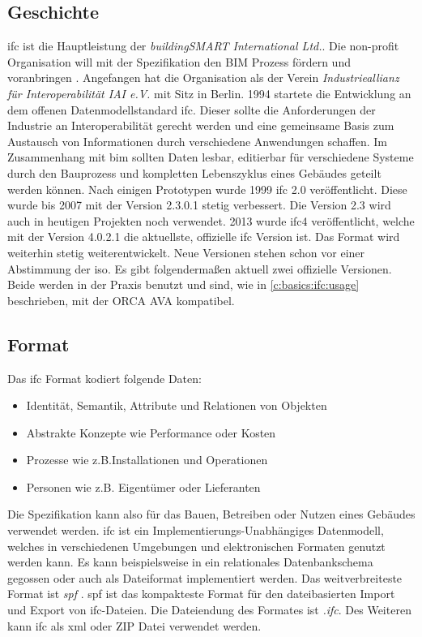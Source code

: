 \subsection{Geschichte}
\label{c:basics:ifc:history}
\ac{ifc} ist die Hauptleistung der \textit{buildingSMART International Ltd.}. Die non-profit Organisation will mit der Spezifikation den BIM Prozess fördern und voranbringen \citep[vgl.][]{BuildingSMART_IFC}.
Angefangen hat die Organisation als der Verein \textit{Industrieallianz für Interoperabilität IAI e.V.} mit Sitz in Berlin. 1994 startete die Entwicklung an dem offenen Datenmodellstandard \ac{ifc}. Dieser sollte die Anforderungen der Industrie an Interoperabilität gerecht werden und eine gemeinsame Basis zum Austausch von Informationen durch verschiedene Anwendungen schaffen. Im Zusammenhang mit \ac{bim} sollten Daten lesbar, editierbar für verschiedene Systeme durch den Bauprozess und kompletten Lebenszyklus eines Gebäudes geteilt werden können. \citep[vgl.][]{Laakso2012-oi} Nach einigen Prototypen wurde 1999 \ac{ifc} 2.0 veröffentlicht. Diese wurde bis 2007 mit der Version 2.3.0.1 stetig verbessert. Die Version 2.3 wird auch in heutigen Projekten noch verwendet. 2013 wurde \ac{ifc}4 veröffentlicht, welche mit der Version 4.0.2.1 die aktuellste, offizielle \ac{ifc} Version ist. Das Format wird weiterhin stetig weiterentwickelt. Neue Versionen stehen schon vor einer Abstimmung der \ac{iso}. \citep[vgl.][]{BuildingSMART_history_2022} Es gibt folgendermaßen aktuell zwei offizielle Versionen. Beide werden in der Praxis benutzt und sind, wie in \autoref{c:basics:ifc:usage} beschrieben, mit der ORCA AVA kompatibel.


\subsection{Format}
\label{c:basics:ifc:format}
Das \ac{ifc} Format kodiert folgende Daten:
\begin{itemize}
	\item Identität, Semantik, Attribute und Relationen von Objekten
	\item Abstrakte Konzepte wie Performance oder Kosten
	\item Prozesse wie z.B.Installationen und Operationen
	\item Personen wie z.B. Eigentümer oder Lieferanten
\end{itemize}
Die Spezifikation kann also für das Bauen, Betreiben oder Nutzen eines Gebäudes verwendet werden. \ac{ifc} ist ein Implementierungs-Unabhängiges Datenmodell, welches in verschiedenen Umgebungen und elektronischen Formaten genutzt werden kann. Es kann beispielsweise in ein relationales Datenbankschema gegossen oder auch als Dateiformat implementiert werden. Das weitverbreiteste Format ist \textit{\ac{spf}} \citep[vgl.][]{Laakso2012-oi,BuildingSMART_IFC}. \ac{spf} ist das kompakteste Format für den dateibasierten Import und Export von \ac{ifc}-Dateien. Die Dateiendung des Formates ist \glqq \textit{.ifc}\grqq{}. Des Weiteren kann \ac{ifc} als \ac{xml} oder ZIP Datei verwendet werden. \citep[vgl.][]{BuildingSMART_IFC}


